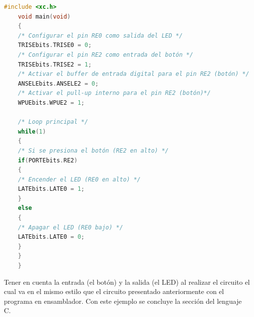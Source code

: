 \documentclass[conference]{IEEEtran}
\begin{document}
    \begin{lstlisting}[language=C, caption=Encender el LED al presionar el botón (con unión de bit)]
    #include <xc.h>
    void main(void)
    {
    /* Configurar el pin RE0 como salida del LED */
    TRISEbits.TRISE0 = 0;
    /* Configurar el pin RE2 como entrada del botón */
    TRISEbits.TRISE2 = 1;
    /* Activar el buffer de entrada digital para el pin RE2 (botón) */
    ANSELEbits.ANSELE2 = 0;
    /* Activar el pull-up interno para el pin RE2 (botón)*/
    WPUEbits.WPUE2 = 1;

    /* Loop principal */
    while(1)
    {
    /* Si se presiona el botón (RE2 en alto) */
    if(PORTEbits.RE2)
    {
    /* Encender el LED (RE0 en alto) */
    LATEbits.LATE0 = 1;
    }
    else
    {
    /* Apagar el LED (RE0 bajo) */
    LATEbits.LATE0 = 0;
    }
    }
    }
\end{lstlisting}

Tener en cuenta la entrada (el botón) y la salida (el LED) al realizar el circuito el cual va en el mismo estilo que el circuito presentado anteriormente con el programa en ensamblador. Con este ejemplo se concluye la sección del lenguaje C.

\printbibliography
\end{document}
